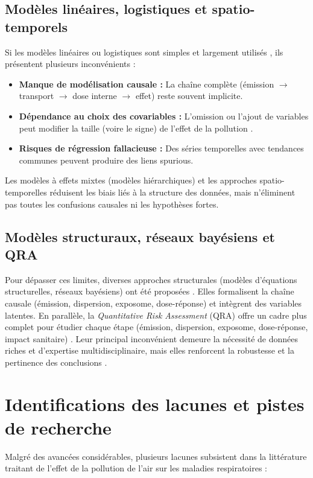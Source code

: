 \subsection{Modèles linéaires, logistiques et spatio-temporels}
Si les modèles linéaires ou logistiques sont simples et largement utilisés \citep{Cui2003}, ils présentent plusieurs inconvénients \citep{Fewell2007,Jacobs1979,Christenfeld2004,Chen2006} :
\begin{itemize}
    \item \textbf{Manque de modélisation causale :} La chaîne complète (émission $\to$ transport $\to$ dose interne $\to$ effet) reste souvent implicite.
    \item \textbf{Dépendance au choix des covariables :} L’omission ou l’ajout de variables peut modifier la taille (voire le signe) de l’effet de la pollution \citep{Sneeringer2009}.
    \item \textbf{Risques de régression fallacieuse :} Des séries temporelles avec tendances communes peuvent produire des liens spurious.
\end{itemize}

Les modèles à effets mixtes (modèles hiérarchiques) \citep{Wakefield2009} et les approches spatio-temporelles réduisent les biais liés à la structure des données, mais n’éliminent pas toutes les confusions causales ni les hypothèses fortes.

\subsection{Modèles structuraux, réseaux bayésiens et QRA}
Pour dépasser ces limites, diverses approches structurales (modèles d'équations structurelles, réseaux bayésiens) ont été proposées \citep{Pearl2009,Shipley2000,Ellis2008}. Elles formalisent la chaîne causale (émission, dispersion, exposome, dose-réponse) et intègrent des variables latentes. En parallèle, la \emph{Quantitative Risk Assessment} (QRA) offre un cadre plus complet pour étudier chaque étape (émission, dispersion, exposome, dose-réponse, impact sanitaire) \citep{Greenland2002,Cox2005,Shih2006}. Leur principal inconvénient demeure la nécessité de données riches et d’expertise multidisciplinaire, mais elles renforcent la robustesse et la pertinence des conclusions \citep{Greenland2001,Lucas1976}.

\section{Identifications des lacunes et pistes de recherche}
Malgré des avancées considérables, plusieurs lacunes subsistent dans la littérature traitant de l’effet de la pollution de l’air sur les maladies respiratoires :

